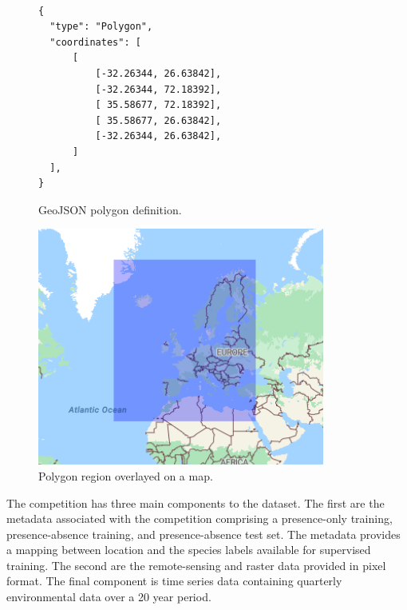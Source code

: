 \begin{figure}[h]
\centering
  \begin{minipage}{0.49\linewidth}
    \begin{lstlisting}[frame=single]

{
  "type": "Polygon",
  "coordinates": [
      [
          [-32.26344, 26.63842],
          [-32.26344, 72.18392],
          [ 35.58677, 72.18392],
          [ 35.58677, 26.63842],
          [-32.26344, 26.63842],
      ]
  ],
}

    \end{lstlisting}
    \caption{GeoJSON polygon definition.}
    \label{lst:geojson-definition}
  \end{minipage}
  \hfill
  \begin{minipage}{0.49\linewidth}
      \centering
      \includegraphics[width=1\linewidth]{figures/geojson.png}
      \caption{Polygon region overlayed on a map.}
      \label{fig:geojson-region}
  \end{minipage}
\end{figure}


The competition has three main components to the dataset. 
The first are the metadata associated with the competition comprising a presence-only training, presence-absence training, and presence-absence test set. 
The metadata provides a mapping between location and the species labels available for supervised training. 
The second are the remote-sensing and raster data provided in pixel format. 
The final component is time series data containing quarterly environmental data over a 20 year period. 

